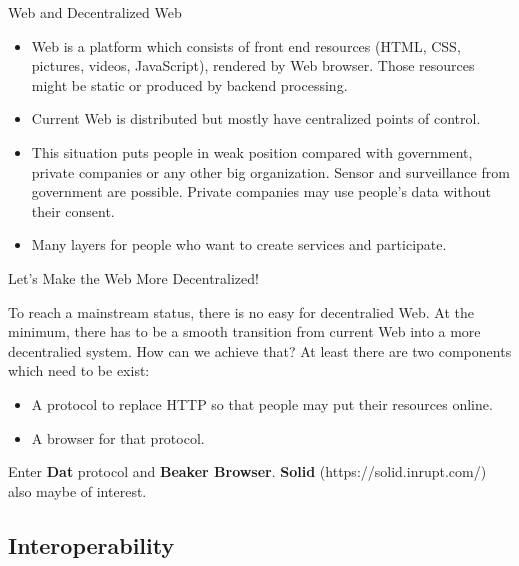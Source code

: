 \documentclass[10pt]{beamer}
\begin{document}
    \begin{frame}[fragile]{Web and Decentralized Web}

      \begin{itemize}
        \item Web is a platform which consists of front end resources (HTML, CSS, pictures, videos, JavaScript), rendered by Web browser. Those resources might be static or produced by backend processing. 
        \item Current Web is distributed but mostly have centralized points of control.
        \item This situation puts people in weak position compared with government, private companies or any other big organization. Sensor and surveillance from government are possible. Private companies may use people's data without their consent.
        \item Many layers for people who want to create services and participate.
      \end{itemize}

    \end{frame}

    \begin{frame}[fragile]{Let's Make the Web More Decentralized!}

      To reach a mainstream status, there is no easy for decentralied Web. At the minimum, there has to be a smooth transition from current Web into a more decentralied system. How can we achieve that? At least there are two components which need to be exist:

      \begin{itemize}
        \item A protocol to replace HTTP so that people may put their resources online.
        \item A browser for that protocol.
      \end{itemize}

      Enter \textbf{Dat} protocol and \textbf{Beaker Browser}. \textbf{Solid} (https://solid.inrupt.com/) also maybe of interest.

    \end{frame}

  \subsection{Interoperability}
\end{document}
